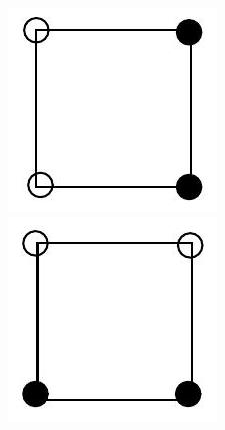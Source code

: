 \documentclass[10pt]{article}
\begin{document}
\includegraphics[max width=\textwidth, center]{2025_09_05_3ba26226ec0baddb5a03g-50(5)}\\
\includegraphics[max width=\textwidth, center]{2025_09_05_3ba26226ec0baddb5a03g-50(13)}\\
\end{document}
